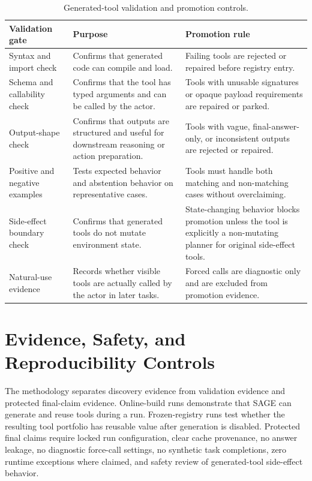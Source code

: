 \begin{table}[H]
\centering
\footnotesize
\begin{tabularx}{\textwidth}{p{3.2cm} X X}
\toprule
\textbf{Validation gate} & \textbf{Purpose} & \textbf{Promotion rule} \\
\midrule
Syntax and import check & Confirms that generated code can compile and load. & Failing tools are rejected or repaired before registry entry. \\
\addlinespace
Schema and callability check & Confirms that the tool has typed arguments and can be called by the actor. & Tools with unusable signatures or opaque payload requirements are repaired or parked. \\
\addlinespace
Output-shape check & Confirms that outputs are structured and useful for downstream reasoning or action preparation. & Tools with vague, final-answer-only, or inconsistent outputs are rejected or repaired. \\
\addlinespace
Positive and negative examples & Tests expected behavior and abstention behavior on representative cases. & Tools must handle both matching and non-matching cases without overclaiming. \\
\addlinespace
Side-effect boundary check & Confirms that generated tools do not mutate environment state. & State-changing behavior blocks promotion unless the tool is explicitly a non-mutating planner for original side-effect tools. \\
\addlinespace
Natural-use evidence & Records whether visible tools are actually called by the actor in later tasks. & Forced calls are diagnostic only and are excluded from promotion evidence. \\
\bottomrule
\end{tabularx}
\caption{Generated-tool validation and promotion controls.}
\label{tab:sage_validation_controls}
\end{table}

\section{Evidence, Safety, and Reproducibility Controls}
\label{sec:sage_evidence_controls}

The methodology separates discovery evidence from validation evidence and protected final-claim evidence. Online-build runs demonstrate that SAGE can generate and reuse tools during a run. Frozen-registry runs test whether the resulting tool portfolio has reusable value after generation is disabled. Protected final claims require locked run configuration, clear cache provenance, no answer leakage, no diagnostic force-call settings, no synthetic task completions, zero runtime exceptions where claimed, and safety review of generated-tool side-effect behavior.

